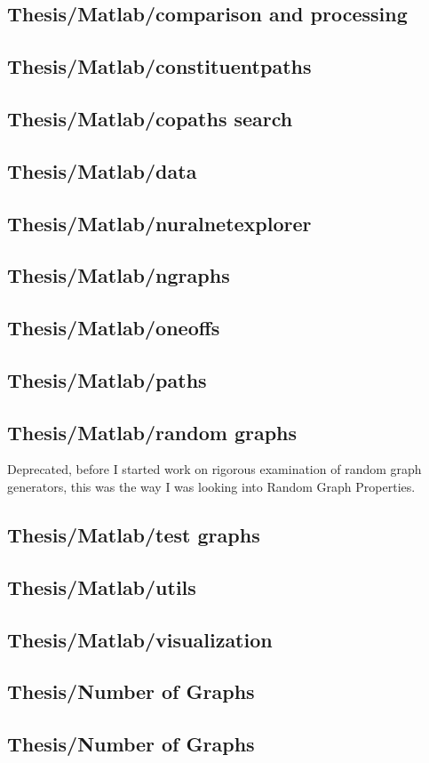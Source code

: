 \subsection*{Thesis/Matlab/comparison and processing}

\subsection*{Thesis/Matlab/constituentpaths}

\subsection*{Thesis/Matlab/copaths search}

\subsection*{Thesis/Matlab/data}

\subsection*{Thesis/Matlab/nuralnetexplorer}

\subsection*{Thesis/Matlab/ngraphs}

\subsection*{Thesis/Matlab/oneoffs}

\subsection*{Thesis/Matlab/paths}

\subsection*{Thesis/Matlab/random graphs}
Deprecated, before I started work on rigorous examination of random graph generators, this was the way I was looking into Random Graph Properties.

\subsection*{Thesis/Matlab/test graphs}

\subsection*{Thesis/Matlab/utils}

\subsection*{Thesis/Matlab/visualization}


\subsection{Thesis/Number of Graphs}


\subsection{Thesis/Number of Graphs}